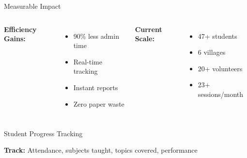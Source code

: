 \documentclass[aspectratio=169]{beamer}
\begin{document}
\begin{frame}{Measurable Impact}
    \begin{columns}
        \textbf{Efficiency Gains:}
        \begin{itemize}
            \item 90\% less admin time
            \item Real-time tracking
            \item Instant reports
            \item Zero paper waste
        \end{itemize}
        
        \vspace{1em}
        
        \textbf{Current Scale:}
        \begin{itemize}
            \item 47+ students
            \item 6 villages
            \item 20+ volunteers
            \item 23+ sessions/month
        \end{itemize}
        
        \centering
    \end{columns}
\end{frame}

\begin{frame}{Student Progress Tracking}
    \begin{center}
    \end{center}
    
    \vspace{1em}
    
    \textbf{Track:} Attendance, subjects taught, topics covered, performance
\end{frame}
\end{document}
